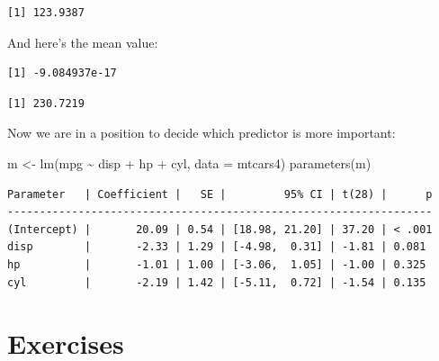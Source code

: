\documentclass[
  letterpaper,
  DIV=11,
  numbers=noendperiod]{scrreprt}
\newenvironment{Shaded}{\begin{snugshade}}{\end{snugshade}}
\newcommand{\AttributeTok}[1]{\textcolor[rgb]{0.40,0.45,0.13}{#1}}
\newcommand{\FunctionTok}[1]{\textcolor[rgb]{0.28,0.35,0.67}{#1}}
\newcommand{\NormalTok}[1]{\textcolor[rgb]{0.00,0.23,0.31}{#1}}
\newcommand{\OtherTok}[1]{\textcolor[rgb]{0.00,0.23,0.31}{#1}}
\newcommand{\SpecialCharTok}[1]{\textcolor[rgb]{0.37,0.37,0.37}{#1}}
\theoremstyle{definition}
\theoremstyle{definition}
\theoremstyle{remark}
\begin{document}
\begin{verbatim}
[1] 123.9387
\end{verbatim}

And here's the mean value:

\begin{Shaded}
\end{Shaded}

\begin{verbatim}
[1] -9.084937e-17
\end{verbatim}

\begin{Shaded}
\end{Shaded}

\begin{verbatim}
[1] 230.7219
\end{verbatim}

Now we are in a position to decide which predictor is more important:

\begin{Shaded}
\begin{Highlighting}[]
\NormalTok{m }\OtherTok{\textless{}{-}} \FunctionTok{lm}\NormalTok{(mpg }\SpecialCharTok{\textasciitilde{}}\NormalTok{ disp }\SpecialCharTok{+}\NormalTok{ hp }\SpecialCharTok{+}\NormalTok{ cyl, }\AttributeTok{data =}\NormalTok{ mtcars4)}
\FunctionTok{parameters}\NormalTok{(m)}
\end{Highlighting}
\end{Shaded}

\begin{verbatim}
Parameter   | Coefficient |   SE |         95% CI | t(28) |      p
------------------------------------------------------------------
(Intercept) |       20.09 | 0.54 | [18.98, 21.20] | 37.20 | < .001
disp        |       -2.33 | 1.29 | [-4.98,  0.31] | -1.81 | 0.081 
hp          |       -1.01 | 1.00 | [-3.06,  1.05] | -1.00 | 0.325 
cyl         |       -2.19 | 1.42 | [-5.11,  0.72] | -1.54 | 0.135 
\end{verbatim}

\hypertarget{exercises-1}{%
\section{Exercises}\label{exercises-1}}
\end{document}
